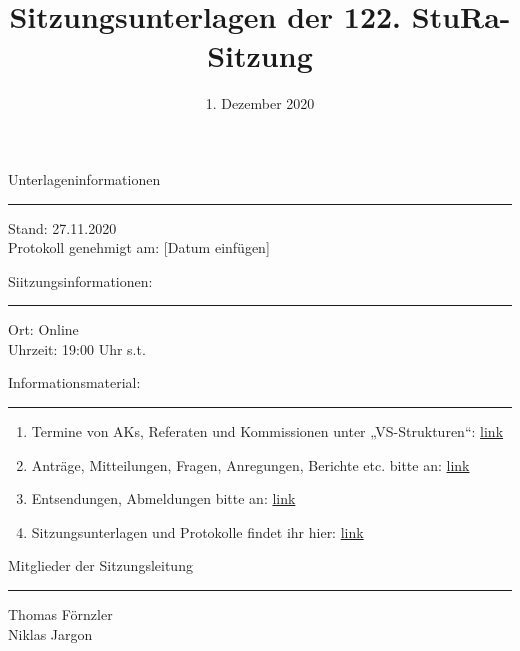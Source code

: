\title{Sitzungsunterlagen der 122. StuRa-Sitzung}
\date{\vspace{-2em}1. Dezember 2020\vspace{-1em}} %
\maketitle

Unterlageninformationen
\vspace{.5em}\hrule\vspace{.5em}
Stand: 27.11.2020\\
Protokoll genehmigt am: [Datum einfügen]
\vspace{1.5em}

Siitzungsinformationen:
\vspace{.5em}\hrule\vspace{.5em}
Ort: Online\\
Uhrzeit: 19:00 Uhr s.t.
\vspace{1.5em}

Informationsmaterial:
\vspace{.5em}\hrule\vspace{.5em}
\begin{enumerate}
    \item Termine von AKs, Referaten und Kommissionen unter „VS-Strukturen“: \href{https://www.stura.uni-heidelberg.de}{link}
    \item Anträge, Mitteilungen, Fragen, Anregungen, Berichte etc. bitte an: \href{mailto:sitzungsleitung@stura.uni-heidelberg.de}{link}
    \item Entsendungen, Abmeldungen bitte an: \href{mailto:entsendung@stura.uni-heidelberg.de}{link}
    \item Sitzungsunterlagen und Protokolle findet ihr hier: \href{https://www.stura.uni-heidelberg.de/vs-strukturen/studierendenrat/protokolle-antraege-beschluesse-der-8-legislatur/}{link}
\end{enumerate}
\vspace{1.5em}

Mitglieder der Sitzungsleitung
\vspace{.5em}\hrule\vspace{.5em}
Thomas Förnzler\\
Niklas Jargon
\pagebreak 